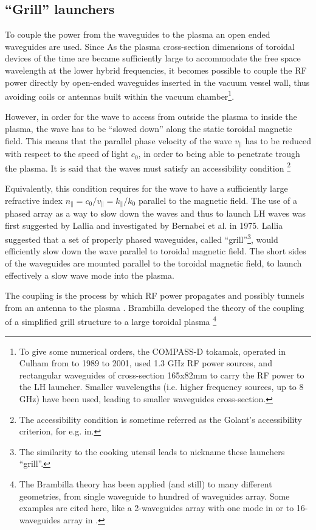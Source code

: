 \subsection{“Grill” launchers}
To couple the power from the waveguides to the plasma an open ended waveguides are used. Since As the plasma cross-section dimensions of toroidal devices of the time are became sufficiently large to accommodate the free space wavelength at the lower hybrid frequencies, it becomes possible to couple the RF power directly by open-ended waveguides inserted in the vacuum vessel wall, thus avoiding coils or antennas built within the vacuum chamber\footnote{To give some numerical orders, the COMPASS-D tokamak, operated in Culham from to 1989 to 2001, used 1.3 GHz RF power sources, and rectangular waveguides of cross-section 165x82mm to carry the RF power to the LH launcher. Smaller wavelengths (i.e. higher frequency sources, up to 8 GHz) have been used, leading to smaller waveguides cross-section.}.
 
However, in order for the wave to access from outside the plasma to inside the plasma, the wave has to be “slowed down” along the static toroidal magnetic field. This means that the parallel phase velocity of the wave $v_{\parallel}$ has to be reduced with respect to the speed of light $c_0$, in order to being able to penetrate trough the plasma. It is said that the waves must satisfy an accessibility condition \cite{Golant1972, Stix1992}\footnote{The accessibility condition is sometime referred as the Golant's accessibility criterion, for e.g. in\cite{Puri1974}.}

Equivalently, this condition requires for the wave to have a sufficiently large refractive index $n_{\parallel} = c_0/v_{\parallel} = k_{\parallel}/k_0$ parallel to the magnetic field. The use of a phased array as a way to slow down the waves and thus to launch LH waves was first suggested by Lallia\cite{Lallia1975} and investigated by Bernabei et al. in 1975\cite{Bernabei1975}. Lallia suggested that a set of properly phased waveguides, called “grill”\footnote{The similarity to the cooking utensil leads to nickname these launchers “grill”.}, would efficiently slow down the wave parallel to toroidal magnetic field. The short sides of the waveguides are mounted parallel to the toroidal magnetic field, to launch effectively a slow wave mode into the plasma. 

The coupling is the process by which RF power propagates and possibly tunnels from an antenna to the plasma \cite{Meneghini2012}. Brambilla developed the theory of the coupling of  a simplified grill structure to a large toroidal plasma \cite{Brambilla1979} \footnote{The Brambilla theory has been applied (and still) to many different geometries, from single waveguide to hundred of waveguides array. Some examples are cited here, like a 2-waveguides array with one mode in \cite{Krapchev1978} or to 16-waveguides array in \cite{Stevens1988}.}

